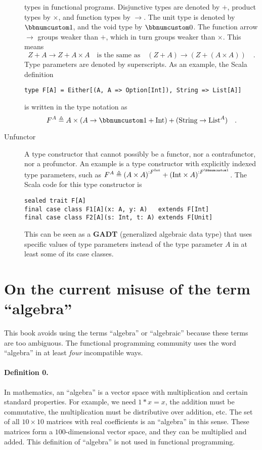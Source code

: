 \begin{description}
types in functional programs. Disjunctive types are denoted by $+$,
product types by $\times$, and function types by $\rightarrow$.
The unit type is denoted by $\bbnum 1$, and the void type by $\bbnum 0$.
The function arrow $\rightarrow$ groups weaker than $+$, which in
turn groups weaker than $\times$. This means
\[
Z+A\rightarrow Z+A\times A\quad\text{is the same as}\quad\left(Z+A\right)\rightarrow\left(Z+\left(A\times A\right)\right)\quad.
\]
 Type parameters are denoted by superscripts. As an example, the Scala
definition\texttt{}
\begin{lstlisting}
type F[A] = Either[(A, A => Option[Int]), String => List[A]]
\end{lstlisting}
is written in the type notation as 
\[
F^{A}\triangleq A\times\left(A\rightarrow\bbnum 1+\text{Int}\right)+(\text{String}\rightarrow\text{List}^{A})\quad.
\]
\item [{\index{unfunctor}Unfunctor}] A type constructor that cannot possibly
be a functor, nor a contrafunctor, nor a profunctor. An example is
a type constructor with explicitly indexed type parameters, such as
$F^{A}\triangleq\left(A\times A\right)^{:F^{\text{Int}}}+\left(\text{Int}\times A\right)^{:F^{\bbnum 1}}$.
The Scala code for this type constructor is
\begin{lstlisting}
sealed trait F[A]
final case class F1[A](x: A, y: A)   extends F[Int]
final case class F2[A](s: Int, t: A) extends F[Unit]
\end{lstlisting}
This can be seen as a \textbf{GADT}
(generalized algebraic data type) that uses specific values of type
parameters instead of the type parameter $A$ in at least some of
its case classes.
\end{description}

\section{On the current misuse of the term ``algebra''}

This book avoids using the terms ``algebra'' or
``algebraic'' because these terms are too ambiguous.
The functional programming community uses the word ``algebra'' in
at least \emph{four} incompatible ways.

\paragraph{Definition 0.}

In mathematics, an \textquotedblleft algebra\textquotedblright{} is
a vector space with multiplication and certain standard properties.
For example, we need $1*x=x$, the addition must be commutative, the
multiplication must be distributive over addition, etc. The set of
all $10\times10$ matrices with real coefficients is an \textquotedblleft algebra\textquotedblright{}
in this sense. These matrices form a $100$-dimensional vector space,
and they can be multiplied and added. This definition of ``algebra''
is not used in functional programming.

